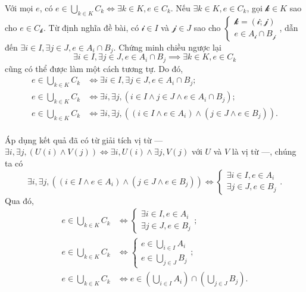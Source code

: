 \resetSubexercise Với mọi $e$, có $e \in \bigcup_{k \in K} C_k \iff \exists k \in K, e \in C_k$. Nếu $\exists k \in K, e \in C_k$, gọi $\mathcal{k} \in K$ sao cho $e \in C_\mathcal{k}$. Từ định nghĩa đề bài, có $\mathcal{i} \in I$ và $\mathcal{j} \in J$ sao cho $\begin{cases}
   \mathcal{k} = \left(\mathcal{i}; \mathcal{j}\right) \\
   e \in A_\mathcal{i} \cap B_\mathcal{j}
\end{cases}$, dẫn đến $\exists i \in I, \exists j \in J, e \in A_i \cap B_j$. Chứng minh chiều ngược lại $$\exists i \in I, \exists j \in J, e \in A_i \cap B_j \implies \exists k \in K, e \in C_k$$ cũng có thể được làm một cách tương tự. Do đó,
\begin{align*}
   e \in \bigcup_{k \in K} C_k &\iff \exists i \in I, \exists j \in J, e \in A_i \cap B_j; \\
   e \in \bigcup_{k \in K} C_k &\iff \exists i, \exists j, \left(i \in I \land j \in J \land e \in A_i \cap B_j\right); \\
   e \in \bigcup_{k \in K} C_k &\iff \exists i, \exists j, \left(\left(i \in I \land e \in A_i\right) \land \left(j \in J \land e \in B_j\right)\right). \\
\end{align*}

Áp dụng kết quả đã có từ giải tích vị từ --- $\exists i, \exists j, (U(i) \land V(j)) \iff \exists i, U(i) \land \exists j, V(j)$ với $U$ và $V$ là vị từ ---, chúng ta có \begin{equation*}
   \exists i, \exists j, \left(\left(i \in I \land e \in A_i\right) \land \left(j \in J \land e \in B_j\right)\right) \iff \begin{cases}
      \exists i \in I, e \in A_i \\
      \exists j \in J, e \in B_j
   \end{cases}.
\end{equation*}
Qua đó, 
\begin{align*}
   e \in \bigcup_{k \in K} C_k &\iff \begin{cases}
      \exists i \in I, e \in A_i \\
      \exists j \in J, e \in B_j
   \end{cases}; \\
   e \in \bigcup_{k \in K} C_k &\iff \begin{cases}
      e \in \bigcup_{i \in I}A_i \\
      e \in \bigcup_{j \in J}B_j
   \end{cases}; \\
   e \in \bigcup_{k \in K} C_k &\iff e \in \left(\bigcup_{i \in I}A_i\right) \cap \left(\bigcup_{j \in J}B_j\right).
\end{align*}

